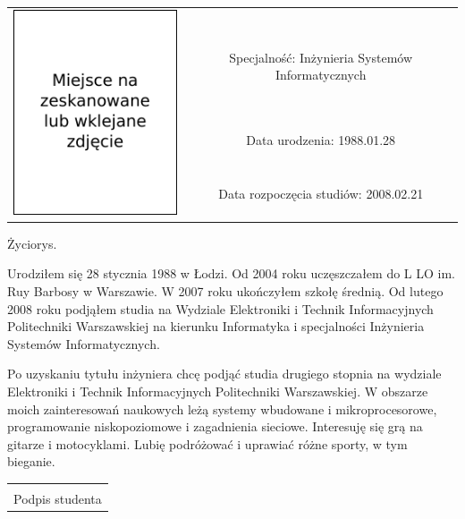 \thispagestyle{empty}

\begin{tabular}{@{}c c}
  \multirow{4}{*}{\includegraphics{img/zdjecie.pdf}} & \\
  & Specjalność: \hfill Inżynieria Systemów Informatycznych \\
\addlinespace[24pt]
  & Data urodzenia: \hfill 1988.01.28 \\ \addlinespace[24pt]
  & Data rozpoczęcia studiów: \hfill 2008.02.21
\end{tabular}

\vspace{48pt}

Życiorys.
\vfill

Urodziłem się 28 stycznia 1988 w Łodzi. Od 2004 roku uczęszczałem do L LO im. Ruy Barbosy w Warszawie. W 2007 roku ukończyłem szkołę średnią. Od lutego 2008 roku podjąłem studia na Wydziale Elektroniki i Technik Informacyjnych Politechniki Warszawskiej na kierunku Informatyka i specjalności Inżynieria Systemów Informatycznych.

Po uzyskaniu tytułu inżyniera chcę podjąć studia drugiego stopnia na wydziale Elektroniki i Technik Informacyjnych Politechniki Warszawskiej. W obszarze moich zainteresowań naukowych leżą systemy wbudowane i mikroprocesorowe, programowanie niskopoziomowe i zagadnienia sieciowe. Interesuję się grą na gitarze i motocyklami. Lubię podróżować i uprawiać różne sporty, w tym bieganie. 

\vspace{24pt}

\begin{flushright}
 \begin{tabular}{>{\centering}m{}@{}}
  \dotfill \\
  Podpis studenta
 \end{tabular}
\end{flushright}

